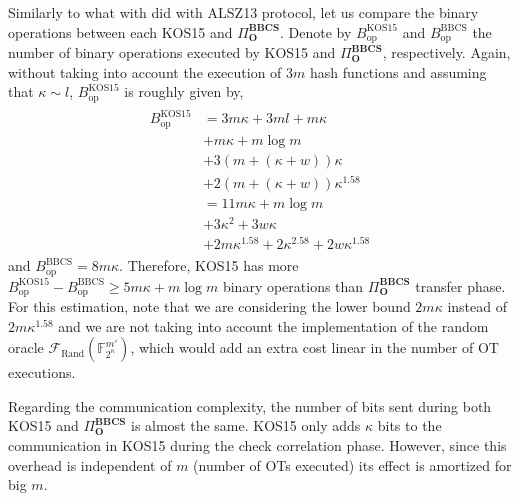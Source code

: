 Similarly to what with did with ALSZ13 protocol, let us compare the binary operations between each KOS15 and $\Pi^{\textbf{BBCS}}_{\textbf{O}}$. Denote by $B_{\text{op}}^\text{KOS15}$ and $B_{\text{op}}^\text{BBCS}$ the number of binary operations executed by KOS15 and $\Pi^{\textbf{BBCS}}_{\textbf{O}}$, respectively. Again, without taking into account the execution of $3 m$ hash functions and assuming that $\kappa \sim l$, $B_{\text{op}}^\text{KOS15}$ is roughly given by,
\begin{eqnarray*}
\begin{split}
    B_{\text{op}}^\text{KOS15} &= 3m\kappa + 3ml + m\kappa \\
    &+ m\kappa + m \log m \\
    &+ 3(m + (\kappa + w))\kappa \\
    &+ 2(m + (\kappa + w))\kappa^{1.58}\\
    &= 11 m \kappa  + m\log m \\
    &+ 3\kappa^2 + 3w\kappa  \\
    &+ 2 m \kappa^{1.58} + 2 \kappa^{2.58} + 2w\kappa^{1.58}
\end{split}
\end{eqnarray*}
and $B_{\text{op}}^\text{BBCS} = 8 m \kappa$. Therefore, KOS15 has more $B_{\text{op}}^\text{KOS15} - B_{\text{op}}^\text{BBCS}  \geq 5 m\kappa + m\log m$ binary operations than $\Pi^{\textbf{BBCS}}_{\textbf{O}}$ transfer phase. 
For this estimation, note that we are considering the lower bound $2 m \kappa$ instead of $2 m \kappa^{1.58}$ and we are not taking into account the implementation of the random oracle $\mathcal{F}_{\text{Rand}}(\mathbb{F}^{m'}_{2^\kappa})$, which would add an extra cost linear in the number of OT executions.

Regarding the communication complexity, the number of bits sent during both KOS15 and $\Pi^{\textbf{BBCS}}_{\textbf{O}}$ is almost the same. KOS15 only adds $\kappa$ bits to the communication in KOS15 during the check correlation phase. However, since this overhead is independent of $m$ (number of OTs executed) its effect is amortized for big $m$.

